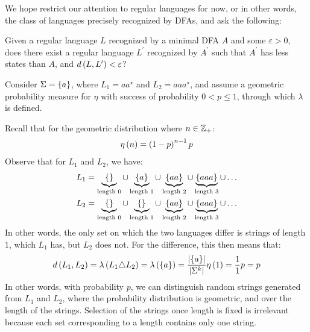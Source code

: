 \documentclass[12pt]{article}
\begin{document}
We hope restrict our attention to regular languages for now,
or in other words, the class of languages precisely recognized by
DFAs, and ask the following:

\begin{question}
  Given a regular language \(L\) recognized by a minimal DFA \(A\)
  and some \(\varepsilon > 0\),
  does there exist a regular language \(L^\prime\) recognized by \(A^\prime\)
  such that \(A^\prime\) has less states than \(A\),
  and \(d\left(L, L^\prime\right) < \varepsilon\)?
\end{question}


\begin{example}
  Consider \(\Sigma = \left\{a\right\}\),
  where \(L_1 = aa^\star\) and \(L_2 = aaa^\star\),
  and assume a geometric probability measure for \(\eta\)
  with success of probability \(0 < p \leq 1\),
  through which \(\lambda\) is defined.

  Recall that for the geometric distribution where \(n \in \mathbb{Z}_{+}\):
  \begin{align*}
    \eta\left(n\right) = \left(1 - p\right)^{n - 1} p
  \end{align*}
  Observe that for \(L_1\) and \(L_2\), we have:
  \begin{align*}
    L_1 &=
      \underbrace{\left\{\right\}}_{\text{length \(0\)}} \cup
      \underbrace{\left\{a\right\}}_{\text{length \(1\)}} \cup
      \underbrace{\left\{aa\right\}}_{\text{length \(2\)}} \cup
      \underbrace{\left\{aaa\right\}}_{\text{length \(3\)}} \cup
      \ldots \\
    L_2 &= 
      \underbrace{\left\{\right\}}_{\text{length \(0\)}} \cup
      \underbrace{\left\{\right\}}_{\text{length \(1\)}} \cup
      \underbrace{\left\{aa\right\}}_{\text{length \(2\)}} \cup
      \underbrace{\left\{aaa\right\}}_{\text{length \(3\)}} \cup
      \ldots
  \end{align*}
  In other words, the only set on which the two languages differ is
  strings of length \(1\), which \(L_1\) has, but \(L_2\) does not.
  For the difference, this then means that:
  \begin{align*}
    d\left(L_1, L_2\right)
      = \lambda\left(L_1 \triangle L_2\right)
      = \lambda\left(\left\{a\right\}\right)
      = \frac{\left\lvert\left\{a\right\}\right\rvert}{\left\lvert\Sigma^k\right\rvert} \eta \left(1\right)
      = \frac{1}{1} p = p
  \end{align*}
  In other words, with probability \(p\),
  we can distinguish random strings generated from \(L_1\) and \(L_2\),
  where the probability distribution is geometric,
  and over the length of the strings.
  Selection of the strings once length is fixed is irrelevant because
  each set corresponding to a length contains only one string.
\end{example}
\end{document}
